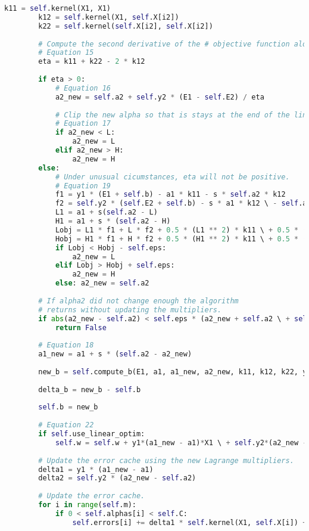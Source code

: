 \begin{lstlisting}[language=python]
        k11 = self.kernel(X1, X1) 
        k12 = self.kernel(X1, self.X[i2]) 
        k22 = self.kernel(self.X[i2], self.X[i2])
        
        # Compute the second derivative of the # objective function along the diagonal. 
        # Equation 15 
        eta = k11 + k22 - 2 * k12 
        
        if eta > 0: 
            # Equation 16 
            a2_new = self.a2 + self.y2 * (E1 - self.E2) / eta 
            
            # Clip the new alpha so that is stays at the end of the line. 
            # Equation 17 
            if a2_new < L: 
                a2_new = L 
            elif a2_new > H: 
                a2_new = H 
        else: 
            # Under unusual cicumstances, eta will not be positive.
            # Equation 19 
            f1 = y1 * (E1 + self.b) - a1 * k11 - s * self.a2 * k12 
            f2 = self.y2 * (self.E2 + self.b) - s * a1 * k12 \ - self.a2 * k22 
            L1 = a1 + s(self.a2 - L)
            H1 = a1 + s * (self.a2 - H) 
            Lobj = L1 * f1 + L * f2 + 0.5 * (L1 ** 2) * k11 \ + 0.5 * (L ** 2) * k22 + s * L * L1 * k12 
            Hobj = H1 * f1 + H * f2 + 0.5 * (H1 ** 2) * k11 \ + 0.5 * (H ** 2) * k22 + s * H * H1 * k12 
            if Lobj < Hobj - self.eps: 
                a2_new = L 
            elif Lobj > Hobj + self.eps: 
                a2_new = H 
            else: a2_new = self.a2 
            
        # If alpha2 did not change enough the algorithm 
        # returns without updating the multipliers. 
        if abs(a2_new - self.a2) < self.eps * (a2_new + self.a2 \ + self.eps): 
            return False 
            
        # Equation 18 
        a1_new = a1 + s * (self.a2 - a2_new) 
        
        new_b = self.compute_b(E1, a1, a1_new, a2_new, k11, k12, k22, y1) 
        
        delta_b = new_b - self.b 
        
        self.b = new_b 
        
        # Equation 22 
        if self.use_linear_optim: 
            self.w = self.w + y1*(a1_new - a1)*X1 \ + self.y2*(a2_new - self.a2) * self.X2 
        
        # Update the error cache using the new Lagrange multipliers. 
        delta1 = y1 * (a1_new - a1) 
        delta2 = self.y2 * (a2_new - self.a2) 
        
        # Update the error cache. 
        for i in range(self.m): 
            if 0 < self.alphas[i] < self.C: 
                self.errors[i] += delta1 * self.kernel(X1, self.X[i]) + delta2 * self.kernel(self.X2,self.X[i]) - delta_b 
            

\end{lstlisting}
